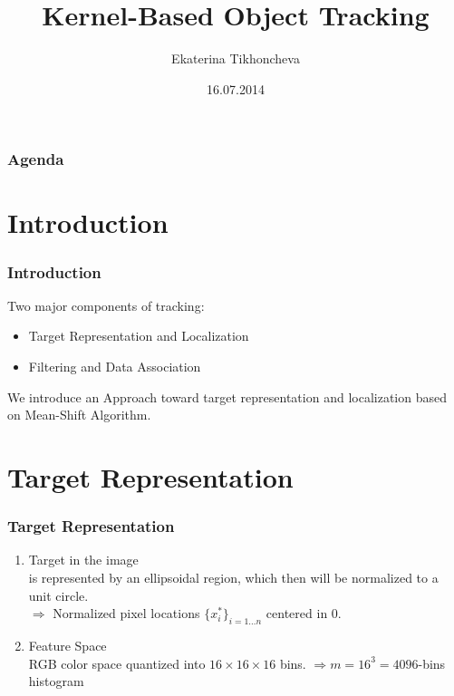 \documentclass[hyperref={pdfpagelabels=false}]{beamer}
\title{Kernel-Based Object Tracking}
\author{Ekaterina Tikhoncheva}
\date{16.07.2014}
\newcounter{saveenumi}
\newcommand{\seti}{\setcounter{saveenumi}{\value{enumi}}}
\begin{document}
\begin{frame}
\titlepage
\end{frame}

\begin{frame}
\frametitle{Agenda}
\tableofcontents
\end{frame} 


\section{Introduction}
\begin{frame}
\frametitle{Introduction}
Two major components of tracking:
\begin{itemize}
\item Target Representation and Localization
\item Filtering and Data Association
\end{itemize}

We introduce an Approach toward target representation and localization based on 
{\color{darkred} Mean-Shift Algorithm}\cite{KernelBasedObjectTracking}.

\end{frame}


\section{Target Representation}
\begin{frame}
\frametitle{Target Representation}
\begin{enumerate}
\item Target in the image \\
	is represented by an {\color{darkred} ellipsoidal region}, which then
	will be normalized to a {\color{darkred} unit circle}.
	\\ $\Rightarrow$ Normalized pixel locations $\{x^{*}_i\}_{i=1\dots n}$ centered in $0$.
\item Feature Space \\
	{\color{darkred} RGB color space} quantized into $16\times 16\times 16$ bins.
	$\Rightarrow m= 16^3 = 4096$-bins histogram
\end{enumerate}

\seti
\end{frame}
\end{document}
